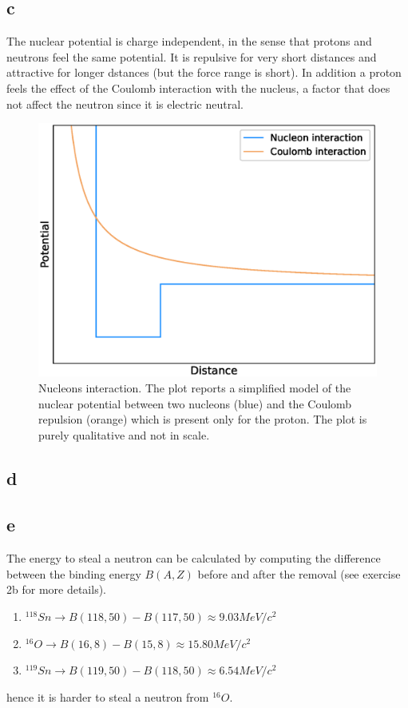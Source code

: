 \subsection*{c}
The nuclear potential is charge independent, in the sense that protons and neutrons feel the same potential. It is repulsive for very short distances and attractive for longer dstances (but the force range is short).
In addition a proton feels the effect of the Coulomb interaction with the nucleus, a factor that does not affect the neutron since it is electric neutral.
\begin{figure}[h]
    \centering 
    \includegraphics[scale=0.4]{ex1/nucleons.eps}
    \caption{Nucleons interaction. The plot reports  a simplified model of the nuclear potential between two nucleons (blue) and the Coulomb repulsion (orange) which is present
    only for the proton. The plot is purely qualitative and not in scale.}
\end{figure}

\subsection*{d}


\subsection*{e}
The energy to steal a neutron can be calculated by computing the difference between the binding energy $B(A, Z)$ before and after the removal (see exercise 2b for more details). 
\begin{enumerate}
    \item $^{118}Sn \rightarrow B(118, 50) - B(117, 50) \approx 9.03 MeV/c^2$
    \item $^{16}O \rightarrow B(16, 8) - B(15, 8) \approx 15.80 MeV/c^2$
    \item $^{119}Sn \rightarrow B(119, 50) - B(118, 50) \approx 6.54 MeV/c^2$
\end{enumerate}
hence it is harder to steal a neutron from $^{16}O$.

